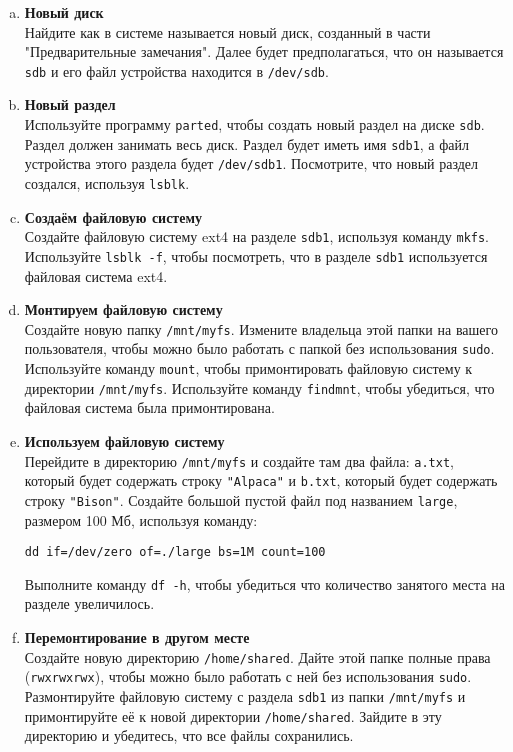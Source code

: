 \documentclass{article}
\begin{document}
\begin{enumerate}[a.]
\item \textbf{Новый диск}\\
Найдите как в системе называется новый диск, созданный в части "Предварительные замечания". Далее будет предполагаться, что он называется \texttt{sdb} и его файл устройства находится в \texttt{/dev/sdb}.

\item \textbf{Новый раздел}\\
Используйте программу \texttt{parted}, чтобы создать новый раздел на диске \texttt{sdb}. Раздел должен занимать весь диск. Раздел будет иметь имя \texttt{sdb1}, а файл устройства этого раздела будет \texttt{/dev/sdb1}. Посмотрите, что новый раздел создался, используя \texttt{lsblk}.

\item \textbf{Создаём файловую систему}\\
Создайте файловую систему ext4 на разделе \texttt{sdb1}, используя команду \texttt{mkfs}. Используйте \texttt{lsblk -f}, чтобы посмотреть, что в разделе \texttt{sdb1} используется файловая система ext4.

\item \textbf{Монтируем файловую систему}\\
Создайте новую папку \texttt{/mnt/myfs}. Измените владельца этой папки на вашего пользователя, чтобы можно было работать с папкой без использования \texttt{sudo}. Используйте команду \texttt{mount}, чтобы примонтировать файловую систему к директории \texttt{/mnt/myfs}. Используйте команду \texttt{findmnt}, чтобы убедиться, что файловая система была примонтирована.

\item \textbf{Используем файловую систему}\\
Перейдите в директорию \texttt{/mnt/myfs} и создайте там два файла: \texttt{a.txt}, который будет содержать строку \texttt{"Alpaca"} и \texttt{b.txt}, который будет содержать строку \texttt{"Bison"}. Создайте большой пустой файл под названием \texttt{large}, размером 100 Мб, используя команду:
\begin{lstlisting}
dd if=/dev/zero of=./large bs=1M count=100
\end{lstlisting}
Выполните команду \texttt{df -h}, чтобы убедиться что количество занятого места на разделе увеличилось.

\item \textbf{Перемонтирование в другом месте}\\
Создайте новую директорию \texttt{/home/shared}. Дайте этой папке полные права (\texttt{rwxrwxrwx}), чтобы можно было работать с ней без использования \texttt{sudo}.  Размонтируйте файловую систему с раздела \texttt{sdb1} из папки \texttt{/mnt/myfs} и примонтируйте её к новой директории \texttt{/home/shared}. Зайдите в эту директорию и убедитесь, что все файлы сохранились. 


\end{enumerate}
\end{document}
